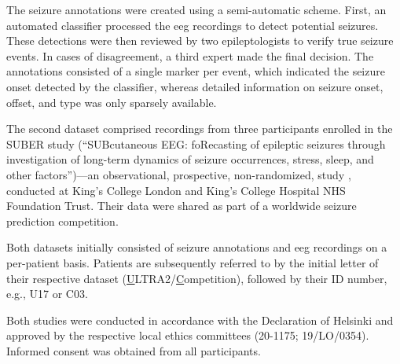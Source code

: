The seizure annotations were created using a semi-automatic scheme. 
First, an automated classifier \parencite{furbass_automatic_2017} processed the \gls{eeg} recordings to detect potential seizures. 
These detections were then reviewed by two epileptologists to verify true seizure events. 
In cases of disagreement, a third expert made the final decision. 
The annotations consisted of a single marker per event, which indicated the seizure onset detected by the classifier, whereas detailed information on seizure onset, offset, and type was only sparsely available. 

The second dataset comprised recordings from three participants enrolled in the SUBER study (“SUBcutaneous EEG: foRecasting of epileptic seizures through
investigation of long-term dynamics of seizure occurrences, stress, sleep, and other factors”)---an observational, prospective, non-randomized, study \parencite{viana_real-world_2025}, conducted at King’s College London and King’s College Hospital NHS Foundation Trust.  
Their data were shared as part of a worldwide seizure prediction competition. 

Both datasets initially consisted of seizure annotations and \gls{eeg} recordings on a per-patient basis. 
Patients are subsequently referred to by the initial letter of their respective dataset (\underline{U}LTRA2/\underline{C}ompetition), followed by their ID number, e.g., U17 or C03.

Both studies were conducted in accordance with the Declaration of Helsinki and approved by the respective local ethics committees (20-1175; 19/LO/0354). 
Informed consent was obtained from all participants.
